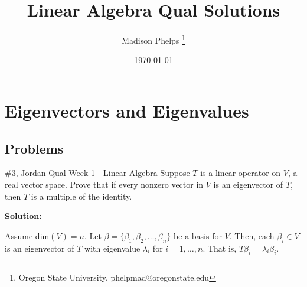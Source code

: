 \documentclass{article}
\title{Linear Algebra Qual Solutions}
\author{Madison Phelps \thanks{Oregon State University, phelpmad@oregonstate.edu}}
\date{\today}
\begin{document}
\maketitle

\thispagestyle{empty}

\break

\tableofcontents

\thispagestyle{empty}

\break

\section{Eigenvectors and Eigenvalues}

\subsection{Problems} 

\begin{problem}{\#3, Jordan Qual Week 1 - Linear Algebra} Suppose $T$ is a linear operator on $V$, a real vector space. Prove that if every nonzero vector in $V$ is an eigenvector of $T$, then $T$ is a multiple of the identity.
\end{problem}

\textbf{Solution:}

Assume dim$(V) = n$. Let $\beta = \{\beta_1, \beta_2, \dots, \beta_n\}$ be a basis for $V$. Then, each $\beta_i\in V$ is an eigenvector of $T$ with eigenvalue $\lambda_i$ for $i = 1, \dots, n$. That is, $T\beta_i = \lambda_i \beta_i$. 
\end{document}
